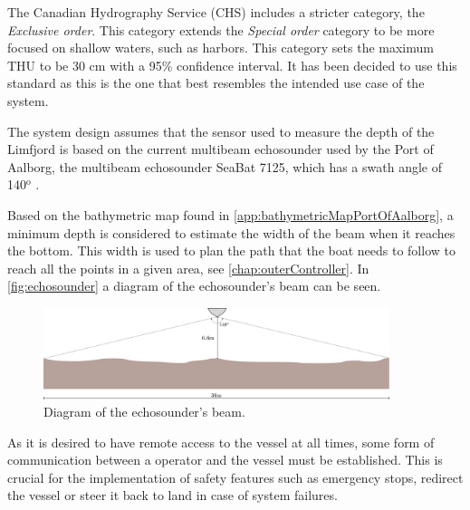 The Canadian Hydrography Service (CHS) includes a stricter category, the \emph{Exclusive order}. 
This category extends the \emph{Special order} category to be more focused on shallow waters, such as harbors. 
This category sets the maximum THU to be 30 cm with a 95\% confidence interval. 
It has been decided to use this standard as this is the one that best resembles the intended use case of the system. \cite{CHS}

The system design assumes that the sensor used to measure the depth of the Limfjord is based on the current multibeam echosounder used by the Port of Aalborg, the multibeam echosounder SeaBat 7125, which has a swath angle of 140$^\mathrm{o}$ \cite{echoSounder}.

Based on the bathymetric map found in \autoref{app:bathymetricMapPortOfAalborg}, a minimum depth is considered to estimate the width of the beam when it reaches the bottom. This width is used to plan the path that the boat needs to follow to reach all the points in a given area, see \autoref{chap:outerController}. In \autoref{fig:echosounder} a diagram of the echosounder's beam can be seen.

\begin{figure}[H]
    \includegraphics[width=0.9\textwidth]{figures/echosounder}
    \caption{Diagram of the echosounder's beam.}
    \label{fig:echosounder}
\end{figure}

As it is desired to have remote access to the vessel at all times, some form of communication between a operator and the vessel must be established. This is crucial for the implementation of safety features such as emergency stops, redirect the vessel or steer it back to land in case of system failures.

